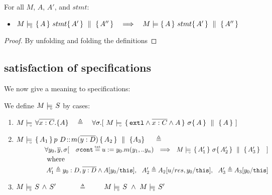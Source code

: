 { 
 \begin{lemma}
For all $M$, $A$, $A'$, and $stmt$:
\begin{itemize}
\item
$M \models\!\!\!\!_{_{\circ}}\   \{\, A \, \}\ stmt \{\, A' \, \} \, \,\parallel\,\, \{\, A'' \, \}     \ \ \ \Longrightarrow \ \ \ M \models  \{\, A \, \}\ stmt \{\, A' \, \} \, \,\parallel\,\, \{\, A'' \, \}  $
\end{itemize}
\end{lemma}
 \begin{proof}
 By unfolding and folding the definitions
 \end{proof}
 
 
\subsection{\Scoped satisfaction of specifications} 
\label{sect:HLmeans}



We now give a \scoped meaning to specifications: 

\begin{definition} 

We define $M \models\!\!\!\!_{_{\circ}}\  {S} $ by cases: %

\label{def:necessity-semantics:strong}

\begin{enumerate}
\item
{ 
$\satisfiesD{M}{\TwoStatesN {\overline {x:C}} {A}} \ \  \ \triangleq   \ \ \ 
\forall \sigma.[\  \satisfiesD {M} {\quadruple {\externalexec \wedge \overline {x:C} \wedge A} {\sigma} {A} {A} } \ ] $
}
  \item
 {$\satisfiesD{M} { \mprepostN {A_1}{p\ D}{m}{y}{D}{A_2} {A_3}    }\  \ \ \   \triangleq  \ \ \ $}\\ 
 {
$\strut  \ \ \   \ \ \ \ \ \ \ \ \   \    \forall   y_0,\overline y, \sigma[ \ \ \ \sigma\prg{cont}\txteq {u:=y_0.m(y_1,..y_n)} \ \ \Longrightarrow \ \ 
\satisfiesD {M} {\quadruple  {A_1'} }   {\sigma}   {A_2' } {A_3' }  \  \ \  ]$ } \\
$\strut \ \ \   \ \ \ \ \ \ \ \ \   \  \mbox{where}$\\
$\strut  \ \ \   \ \ \ \ \ \ \ \ \   \  \ A_1' \triangleq   y_0:D,{\overline {y:D}}   \wedge   A[y_0/\mbox{\normalfont{\texttt{this}}}],\  \  A_2' \triangleq A_2[u/res,y_0/\mbox{\normalfont{\texttt{this}}}],\ \ A_3' \triangleq A_3[y_0/\mbox{\normalfont{\texttt{this}}}] $
 \item
 $M \models\!\!\!\!_{_{\circ}}\  S\, \wedge\, S' $\ \ \  \ \ \  $\triangleq$  \  \ \  \   $\satisfiesD{M}{S}\ \wedge \ \satisfiesD{M}{S'}$
\end{enumerate}
\end{definition}

}
